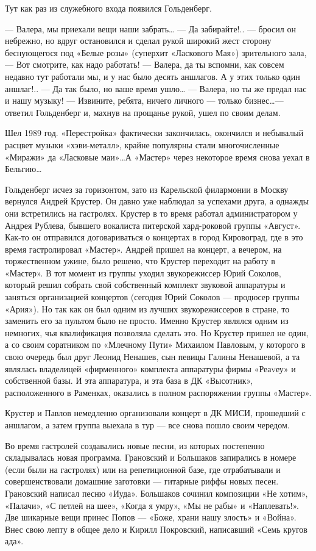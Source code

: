 \documentclass[10pt, twoside]{book}
\begin{document}
Тут как раз из служебного входа появился Гольденберг.

— Валера, мы приехали вещи наши забрать\ldots
— Да забирайте!.. — бросил он небрежно, но вдруг остановился и сделал рукой широкий жест сторону беснующегося под «Белые
розы» (суперхит «Ласкового Мая») зрительного зала, — Вот смотрите, как надо работать!
— Валера, да ты вспомни, как совсем недавно тут работали мы, и у нас было десять аншлагов. А у этих только один
аншлаг!..
— Да так было, но ваше время ушло\ldots
— Валера, но ты же предал нас и нашу музыку!
— Извините, ребята, ничего личного — только бизнес\ldots — ответил Гольденберг и, махнув на прощанье рукой, ушел по
своим делам.

Шел 1989 год. «Перестройка» фактически закончилась, окончился и небывалый расцвет музыки «хэви-металл», крайне популярны
стали многочисленные «Миражи» да «Ласковые маи»\ldots А «Мастер» через некоторое время снова уехал в Бельгию\ldots

Гольденберг исчез за горизонтом, зато из Карельской филармонии в Москву вернулся Андрей Крустер. Он давно уже наблюдал
за успехами друга, а однажды они встретились на гастролях. Крустер в то время работал администратором у Андрея Рублева,
бывшего вокалиста питерской хард-роковой группы «Август». Как-то он отправился договариваться о концертах в город
Кировоград, где в это время гастролировал «Мастер». Андрей пришел на концерт, а вечером, на торжественном ужине, было
решено, что Крустер переходит на работу в «Мастер». В тот момент из группы уходил звукорежиссер Юрий Соколов, который
решил собрать свой собственный комплект звуковой аппаратуры и заняться организацией концертов (сегодня Юрий Соколов —
продюсер группы «Ария»). Но так как он был одним из лучших звукорежиссеров в стране, то заменить его за пультом было не
просто. Именно Крустер являлся одним из немногих, чья квалификация позволяла сделать это. Но Крустер пришел не один, а
со своим соратником по «Млечному Пути» Михаилом Павловым, у которого в свою очередь был друг Леонид Ненашев, сын певицы
Галины Ненашевой, а та являлась владелицей «фирменного» комплекта аппаратуры фирмы «Реаvеу» и собственной базы. И эта
аппаратура, и эта база в ДК «Высотник», расположенного в Раменках, оказались в полном распоряжении группы «Мастер».

Крустер и Павлов немедленно организовали концерт в ДК МИСИ, прошедший с аншлагом, а затем группа выехала в тур — все
снова пошло своим чередом.

Во время гастролей создавались новые песни, из которых постепенно складывалась новая программа. Грановский и Большаков
запирались в номере (если были на гастролях) или на репетиционной базе, где отрабатывали и совершенствовали домашние
заготовки — гитарные риффы новых песен. Грановский написал песню «Иуда». Большаков сочинил композиции «Не хотим»,
«Палачи», «С петлей на шее», «Когда я умру», «Мы не рабы» и «Наплевать!». Две шикарные вещи принес Попов — «Боже, храни
нашу злость» и «Война». Внес свою лепту в общее дело и Кирилл Покровский, написавший «Семь кругов ада».
\end{document}
